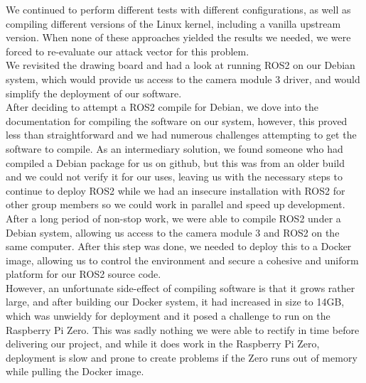 We continued to perform different tests with different configurations, as well as compiling different versions of the Linux kernel, including a vanilla upstream version. When none of these approaches yielded the results we needed, we were forced to re-evaluate our attack vector for this problem.\\

We revisited the drawing board and had a look at running ROS2 on our Debian system, which would provide us access to the camera module 3 driver, and would simplify the deployment of our software. \\

After deciding to attempt a ROS2 compile for Debian, we dove into the documentation for compiling the software on our system, however, this proved less than straightforward and we had numerous challenges attempting to get the software to compile. As an intermediary solution, we found someone who had compiled a Debian package for us on github, but this was from an older build and we could not verify it for our uses, leaving us with the necessary steps to continue to deploy ROS2 while we had an insecure installation with ROS2 for other group members so we could work in parallel and speed up development.\\

After a long period of non-stop work, we were able to compile ROS2 under a Debian system, allowing us access to the camera module 3 and ROS2 on the same computer. After this step was done, we needed to deploy this to a Docker image, allowing us to control the environment and secure a cohesive and uniform platform for our ROS2 source code.\\



However, an unfortunate side-effect of compiling software is that it grows rather large, and after building our Docker system, it had increased in size to 14GB, which was unwieldy for deployment and it posed a challenge to run on the Raspberry Pi Zero. This was sadly nothing we were able to rectify in time before delivering our project, and while it does work in the Raspberry Pi Zero, deployment is slow and prone to create problems if the Zero runs out of memory while pulling the Docker image.\\
